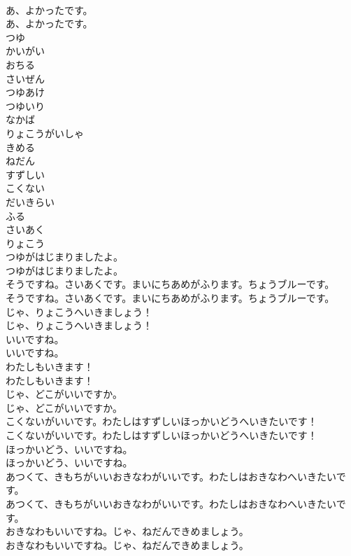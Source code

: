\documentclass[8pt]{extreport}
\begin{document}
\begin{CJK}{UTF8}{min}
\\	あ、よかったです。	
\\	あ、よかったです。 
\\	つゆ
\\	かいがい
\\	おちる
\\	さいぜん
\\	つゆあけ
\\	つゆいり
\\	なかば
\\	りょこうがいしゃ
\\	きめる
\\	ねだん
\\	すずしい
\\	こくない
\\	だいきらい
\\	ふる
\\	さいあく
\\	りょこう
\\	つゆがはじまりましたよ。	
\\	つゆがはじまりましたよ。 
\\	そうですね。さいあくです。まいにちあめがふります。ちょうブルーです。	
\\	そうですね。さいあくです。まいにちあめがふります。ちょうブルーです。 
\\	じゃ、りょこうへいきましょう！	
\\	じゃ、りょこうへいきましょう！ 
\\	いいですね。	
\\	いいですね。 
\\	わたしもいきます！	
\\	わたしもいきます！ 
\\	じゃ、どこがいいですか。	
\\	じゃ、どこがいいですか。 
\\	こくないがいいです。わたしはすずしいほっかいどうへいきたいです！	
\\	こくないがいいです。わたしはすずしいほっかいどうへいきたいです！ 
\\	ほっかいどう、いいですね。	
\\	ほっかいどう、いいですね。 
\\	あつくて、きもちがいいおきなわがいいです。わたしはおきなわへいきたいです。	
\\	あつくて、きもちがいいおきなわがいいです。わたしはおきなわへいきたいです。 
\\	おきなわもいいですね。じゃ、ねだんできめましょう。	
\\	おきなわもいいですね。じゃ、ねだんできめましょう。 

\end{CJK}
\end{document}
